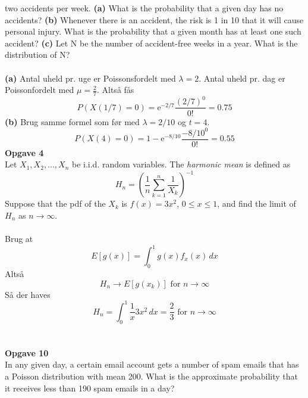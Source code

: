 \documentclass[12pt,a4paper,draft]{report}
\begin{document}
two accidents per week. \textbf{(a)} What is the probability that a given day has no
accidents? \textbf{(b)} Whenever there is an accident, the risk is 1 in 10 that it will
cause personal injury. What is the probability that a given month has at least
one such accident? \textbf{(c)} Let N be the number of accident-free weeks in a year.
What is the distribution of N?\\\\
\textbf{(a)} Antal uheld pr. uge er Poissonsfordelt med $\lambda=2$. Antal uheld pr. dag er Poissonfordelt med $\mu=\frac{2}{7}$. Altså fås
\begin{equation}
P(X(1/7)=0)=\mathrm{e}^{-2/7}\frac{(2/7)^0}{0!}=0.75
\end{equation}
\textbf{(b)} Brug samme formel som før med $\lambda=2/10$ og $t=4$.
\begin{equation}
P(X(4)=0)=1-\mathrm{e}^{-8/10}\frac{-8/10^0}{0!}=0.55
\end{equation}
\textbf{Opgave 4}\\
Let $X_1,X_2,\ldots,X_n$ be i.i.d. random variables. The \textit{harmonic mean} is defined as
\begin{equation}
H_n=\left(\frac{1}{n}\sum_{k=1}^n\frac{1}{X_k}\right)^{-1}
\end{equation}
Suppose that the pdf of the $X_k$ is $f(x)=3x^2$, $0\leq x\leq1$, and find the limit of $H_n$ as $n\to\infty$.\\\\
Brug at
\begin{equation}
E[g(x)]=\int_0^1\!g(x)f_x(x)\,dx
\end{equation}
Altså
\begin{equation}
H_n\to E[g(x_k)]\text{ for }n\to\infty
\end{equation}
Så der haves
\begin{equation}
H_n=\int_0^1\!\frac{1}{x}3x^2\,dx=\frac{2}{3}\text{ for }n\to\infty
\end{equation}
\\\\
\textbf{Opgave 10}\\
In any given day, a certain email account gets a number of spam emails that has
a Poisson distribution with mean 200. What is the approximate probability that
it receives less than 190 spam emails in a day?\\\\
\end{document}
